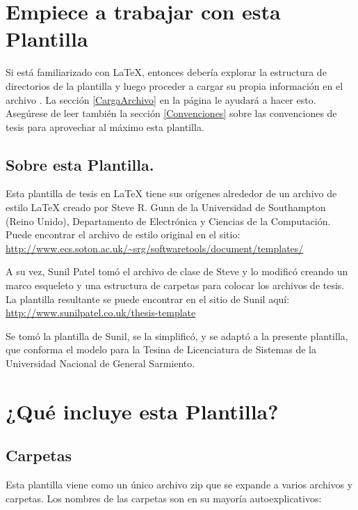 \section{Empiece a trabajar con esta Plantilla}

Si está familiarizado con \LaTeX{}, entonces debería explorar la estructura de directorios de la plantilla y luego proceder a cargar  su propia información en el archivo .  La sección \ref{CargaArchivo} en la página \pageref{CargaArchivo} le ayudará a hacer esto. Asegúrese de leer también la sección \ref{Convenciones} sobre las convenciones de tesis para aprovechar al máximo esta plantilla.

\subsection{Sobre esta Plantilla.}

Esta plantilla de tesis en \LaTeX{} tiene sus orígenes alrededor de un archivo de estilo \LaTeX{} creado por Steve R.  Gunn de la Universidad de Southampton (Reino Unido), Departamento de Electrónica y Ciencias de la Computación. Puede encontrar el archivo de estilo original en el sitio:
\url{http://www.ecs.soton.ac.uk/~srg/softwaretools/document/templates/}

A su vez, Sunil Patel tomó el archivo de clase  de Steve y lo modificó creando un marco esqueleto y una estructura de carpetas para colocar los archivos de tesis. La plantilla resultante se puede encontrar en el sitio de Sunil aquí: \url{http://www.sunilpatel.co.uk/thesis-template}

Se tomó la plantilla de Sunil, se la simplificó, y se adaptó a la presente plantilla, que conforma el modelo para la Tesina de Licenciatura de Sistemas de la Universidad Nacional de General Sarmiento. 

\section{¿Qué incluye esta Plantilla?}

\subsection{Carpetas}
Esta plantilla viene como un único archivo zip que se expande a varios archivos y carpetas. Los nombres de las carpetas son en su mayoría autoexplicativos:

